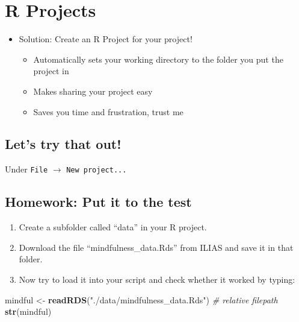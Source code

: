 \documentclass[
]{book}
\newenvironment{Shaded}{\begin{snugshade}}{\end{snugshade}}
\newcommand{\CommentTok}[1]{\textcolor[rgb]{0.56,0.35,0.01}{\textit{#1}}}
\newcommand{\FunctionTok}[1]{\textcolor[rgb]{0.13,0.29,0.53}{\textbf{#1}}}
\newcommand{\NormalTok}[1]{#1}
\newcommand{\OtherTok}[1]{\textcolor[rgb]{0.56,0.35,0.01}{#1}}
\newcommand{\StringTok}[1]{\textcolor[rgb]{0.31,0.60,0.02}{#1}}
\providecommand{\tightlist}{%
  \setlength{\itemsep}{0pt}\setlength{\parskip}{0pt}}
\begin{document}
\section{R Projects}\label{r-projects}

\begin{itemize}
\tightlist
\item
  Solution: Create an R Project for your project!

  \begin{itemize}
  \tightlist
  \item
    Automatically sets your working directory to the folder you put the project in
  \item
    Makes sharing your project easy
  \item
    Saves you time and frustration, trust me
  \end{itemize}
\end{itemize}

\subsection{Let's try that out!}\label{lets-try-that-out}

Under \texttt{File} \(\rightarrow\) \texttt{New\ project...}

\subsection{Homework: Put it to the test}\label{homework-put-it-to-the-test}

\begin{enumerate}
\def\labelenumi{\arabic{enumi}.}
\tightlist
\item
  Create a subfolder called ``data'' in your R project.
\item
  Download the file ``mindfulness\_data.Rds'' from ILIAS and save it in that folder.
\item
  Now try to load it into your script and check whether it worked by typing:
\end{enumerate}

\begin{Shaded}
\begin{Highlighting}[]
\NormalTok{mindful }\OtherTok{\textless{}{-}} \FunctionTok{readRDS}\NormalTok{(}\StringTok{"./data/mindfulness\_data.Rds"}\NormalTok{) }\CommentTok{\# relative filepath}
\FunctionTok{str}\NormalTok{(mindful)}
\end{Highlighting}
\end{Shaded}
\end{document}
